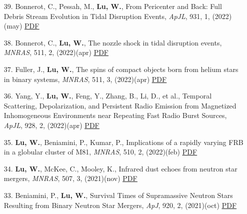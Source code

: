 \begin{itemize}[leftmargin=0.65cm]
\vspace{-0.1cm}
\item[39.]{Bonnerot, C., Pessah, M., {\bf Lu, W.}, {From Pericenter and Back: Full Debris Stream Evolution in Tidal Disruption Events}, {\it ApJL}, 931, 1, (2022)(may) \href{https://ui.adsabs.harvard.edu/abs/2022ApJ...931L...6B}{\underline{PDF}}}

\vspace{-0.1cm}
\item[38.]{Bonnerot, C., {\bf Lu, W.}, {The nozzle shock in tidal disruption events}, {\it MNRAS}, 511, 2, (2022)(apr) \href{https://ui.adsabs.harvard.edu/abs/2022MNRAS.511.2147B}{\underline{PDF}}}

\vspace{-0.1cm}
\item[37.]{Fuller, J., {\bf Lu, W.}, {The spins of compact objects born from helium stars in binary systems}, {\it MNRAS}, 511, 3, (2022)(apr) \href{https://ui.adsabs.harvard.edu/abs/2022MNRAS.511.3951F}{\underline{PDF}}}

\vspace{-0.1cm}
\item[36.]{Yang, Y., {\bf Lu, W.}, Feng, Y., Zhang, B., Li, D., et al., {Temporal Scattering, Depolarization, and Persistent Radio Emission from Magnetized Inhomogeneous Environments near Repeating Fast Radio Burst Sources}, {\it ApJL}, 928, 2, (2022)(apr) \href{https://ui.adsabs.harvard.edu/abs/2022ApJ...928L..16Y}{\underline{PDF}}}

\vspace{-0.1cm}
\item[35.]{{\bf Lu, W.}, Beniamini, P., Kumar, P., {Implications of a rapidly varying FRB in a globular cluster of M81}, {\it MNRAS}, 510, 2, (2022)(feb) \href{https://ui.adsabs.harvard.edu/abs/2022MNRAS.510.1867L}{\underline{PDF}}}

\vspace{-0.1cm}
\item[34.]{{\bf Lu, W.}, McKee, C., Mooley, K., {Infrared dust echoes from neutron star mergers}, {\it MNRAS}, 507, 3, (2021)(nov) \href{https://ui.adsabs.harvard.edu/abs/2021MNRAS.507.3672L}{\underline{PDF}}}

\vspace{-0.1cm}
\item[33.]{Beniamini, P., {\bf Lu, W.}, {Survival Times of Supramassive Neutron Stars Resulting from Binary Neutron Star Mergers}, {\it ApJ}, 920, 2, (2021)(oct) \href{https://ui.adsabs.harvard.edu/abs/2021ApJ...920..109B}{\underline{PDF}}}


\end{itemize}
